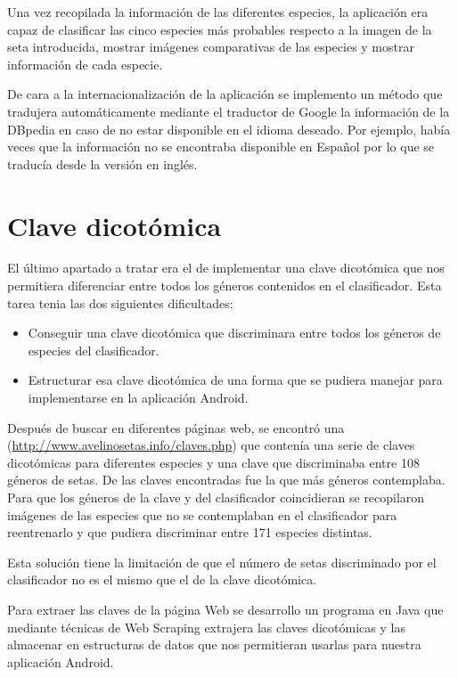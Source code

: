 Una vez recopilada la información de las diferentes especies, la aplicación era capaz de clasificar las cinco especies más probables respecto a la imagen de la seta introducida, mostrar imágenes comparativas de las especies y mostrar información de cada especie.

De cara a la internacionalización de la aplicación se implemento un método que tradujera automáticamente mediante el traductor de Google la información de la DBpedia en caso de no estar disponible en el idioma deseado. Por ejemplo, había veces que la información no se encontraba disponible en Español por lo que se traducía desde la versión en inglés.

\section{Clave dicotómica}

El último apartado a tratar era el de implementar una clave dicotómica que nos permitiera diferenciar entre todos los géneros contenidos en el clasificador. Esta tarea tenia las dos siguientes dificultades:

\begin{itemize}
	\item Conseguir una clave dicotómica que discriminara entre todos los géneros de especies del clasificador.
	\item Estructurar esa clave dicotómica de una forma que se pudiera manejar para implementarse en la aplicación Android.
\end{itemize}

Después de buscar en diferentes páginas web, se encontró una (\url{http://www.avelinosetas.info/claves.php}) que contenía una serie de claves dicotómicas para diferentes especies y una clave que discriminaba entre 108 géneros de setas. De las claves encontradas fue la que más géneros contemplaba. Para que los géneros de la clave y del clasificador coincidieran se recopilaron imágenes de las especies que no se contemplaban en el clasificador para reentrenarlo y que pudiera discriminar entre 171 especies distintas.

Esta solución tiene la limitación de que el número de setas discriminado por el clasificador no es el mismo que el de la clave dicotómica.

Para extraer las claves de la página Web se desarrollo un programa en Java que mediante técnicas de Web Scraping extrajera las claves dicotómicas y las almacenar en estructuras de datos que nos permitieran usarlas para nuestra aplicación Android.

